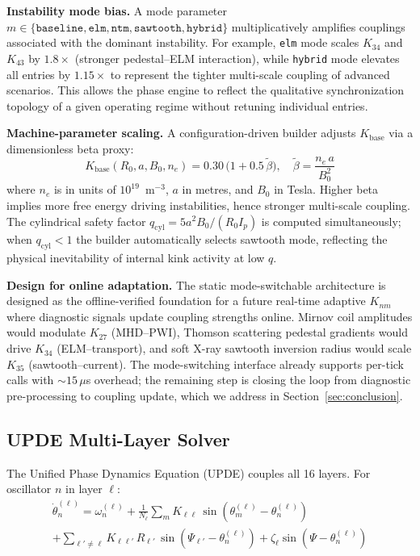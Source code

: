 \documentclass[twocolumn,preprintnumbers,amsmath,amssymb,prl,floatfix]{revtex4-2}
\begin{document}
\textbf{Instability mode bias.}\quad
A mode parameter $m \in \{\texttt{baseline}, \texttt{elm},
\texttt{ntm}, \texttt{sawtooth}, \texttt{hybrid}\}$ multiplicatively
amplifies couplings associated with the dominant instability.
For example, \texttt{elm} mode scales $K_{34}$ and $K_{43}$ by
$1.8\times$ (stronger pedestal--ELM interaction), while
\texttt{hybrid} mode elevates all entries by $1.15\times$ to
represent the tighter multi-scale coupling of advanced scenarios.
This allows the phase engine to reflect the qualitative
synchronization topology of a given operating regime without
retuning individual entries.

\textbf{Machine-parameter scaling.}\quad
A configuration-driven builder adjusts $K_\mathrm{base}$ via a
dimensionless beta proxy:
%
\begin{equation}
  K_\mathrm{base}(R_0, a, B_0, n_e)
  = 0.30\,\bigl(1 + 0.5\,\tilde{\beta}\bigr),\quad
  \tilde{\beta} = \frac{n_e\, a}{B_0^2}
  \label{eq:kbase_beta}
\end{equation}
%
where $n_e$ is in units of $10^{19}$~m$^{-3}$, $a$ in metres, and
$B_0$ in Tesla.  Higher beta implies more free energy driving
instabilities, hence stronger multi-scale coupling.  The
cylindrical safety factor $q_\mathrm{cyl} = 5 a^2 B_0 / (R_0 I_p)$
is computed simultaneously; when $q_\mathrm{cyl} < 1$ the builder
automatically selects sawtooth mode, reflecting the physical
inevitability of internal kink activity at low $q$.

\textbf{Design for online adaptation.}\quad
The static mode-switchable architecture is designed as the
offline-verified foundation for a future real-time adaptive $K_{nm}$
where diagnostic signals update coupling strengths online.
Mirnov coil amplitudes would modulate $K_{27}$ (MHD--PWI),
Thomson scattering pedestal gradients would drive $K_{34}$
(ELM--transport), and soft X-ray sawtooth inversion radius would
scale $K_{35}$ (sawtooth--current).
The mode-switching interface already supports per-tick calls with
${\sim}15\,\mu$s overhead; the remaining step is closing the loop
from diagnostic pre-processing to coupling update, which we address
in Section~\ref{sec:conclusion}.

\subsection{UPDE Multi-Layer Solver}

The Unified Phase Dynamics Equation (UPDE) couples all 16 layers.
For oscillator $n$ in layer $\ell$:
%
\begin{multline}
  \dot{\theta}_n^{(\ell)} = \omega_n^{(\ell)}
  + \frac{1}{N_\ell} \sum_m K_{\ell\ell}\,
    \sin\!\left(\theta_m^{(\ell)} - \theta_n^{(\ell)}\right)
  \\
  + \sum_{\ell' \neq \ell} K_{\ell\ell'}\, R_{\ell'}\,
    \sin\!\left(\Psi_{\ell'} - \theta_n^{(\ell)}\right)
  + \zeta_\ell \sin\!\left(\Psi - \theta_n^{(\ell)}\right)
  \label{eq:upde}
\end{multline}
\end{document}
